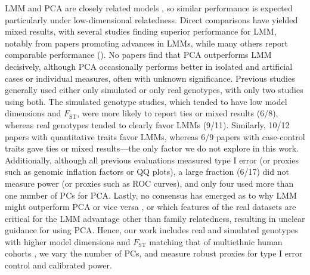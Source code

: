 \documentclass[9pt,lineno]{elife}
\newcommand{\Fst}{F_{\text{ST}}}
\begin{document}
LMM and PCA are closely related models \citep{astle_population_2009, janss_inferences_2012, hoffman_correcting_2013, zhang_principal_2015}, so similar performance is expected particularly under low-dimensional relatedness.
Direct comparisons have yielded mixed results, with several studies finding superior performance for LMM, notably from papers promoting advances in LMMs, while many others report comparable performance ().
No papers find that PCA outperforms LMM decisively, although PCA occasionally performs better in isolated and artificial cases or individual measures, often with unknown significance.
Previous studies generally used either only simulated or only real genotypes, with only two studies using both.
The simulated genotype studies, which tended to have low model dimensions and $\Fst$, were more likely to report ties or mixed results (6/8), whereas real genotypes tended to clearly favor LMMs (9/11).
Similarly, 10/12 papers with quantitative traits favor LMMs, whereas 6/9 papers with case-control traits gave ties or mixed results---the only factor we do not explore in this work.
Additionally, although all previous evaluations measured type I error (or proxies such as genomic inflation factors \citep{devlin_genomic_1999} or QQ plots), a large fraction (6/17) did not measure power (or proxies such as ROC curves), and only four used more than one number of PCs for PCA.
Lastly, no consensus has emerged as to why LMM might outperform PCA or vice versa \citep{price_new_2010, sul_mixed_2013, price_response_2013, hoffman_correcting_2013}, or which features of the real datasets are critical for the LMM advantage other than family relatedness, resulting in unclear guidance for using PCA.
Hence, our work includes real and simulated genotypes with higher model dimensions and $\Fst$ matching that of multiethnic human cohorts \citep{ochoa_estimating_2021, ochoa_new_2019}, we vary the number of PCs, and measure robust proxies for type I error control and calibrated power.
\end{document}
